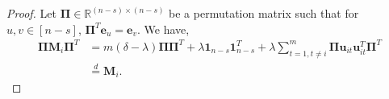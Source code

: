 \documentclass[journal,draftcls,onecolumn]{IEEEtran}
\theoremstyle{mystyle}
\begin{document}
\begin{proof}
Let $\mathbf{\Pi} \in \mathbb{R}^{(n-s) \times (n-s)}$ be a permutation matrix such that for $u, v \in [n-s]$,  $\mathbf{\Pi}^T \mathbf{e}_u = \mathbf{e}_v$. %
We have,
\begin{align*}
\mathbf{\Pi}\mathbf{M}_i\mathbf{\Pi}^T &= m(\delta - \lambda) \mathbf{\Pi}\mathbf{\Pi}^T + \lambda \mathbf{1}_{n-s} \mathbf{1}_{n-s}^T+ \lambda \sum_{t = 1, t\ne i}^m \mathbf{\Pi}\mathbf{u}_{it} \mathbf{u}_{it}^T \mathbf{\Pi}^T\\
&\overset{d}=\mathbf{M}_i.

\end{align*}
\end{proof}
\end{document}
